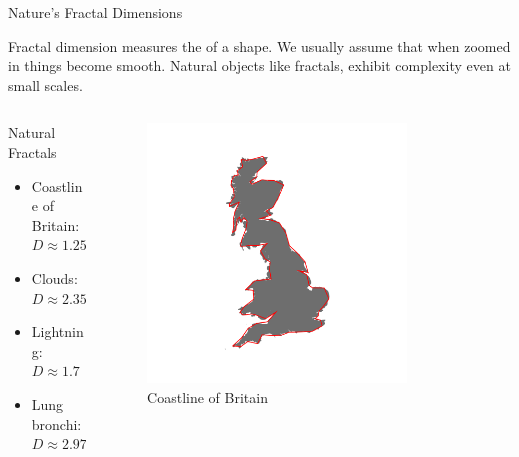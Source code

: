 \begin{frame}{Nature's Fractal Dimensions}

  Fractal dimension measures the  of a shape. We usually assume that
  when zoomed in things become smooth. Natural objects like fractals, exhibit complexity even at small scales.
  \begin{columns}
    \begin{column}{0.5\textwidth}
      \begin{conceptbox}{Natural Fractals}
        \begin{itemize}
          \item Coastline of Britain: $D \approx 1.25$
          \item Clouds: $D \approx 2.35$
          \item Lightning: $D \approx 1.7$
          \item Lung bronchi: $D \approx 2.97$
        \end{itemize}
      \end{conceptbox}
    \end{column}

    \begin{column}{0.5\textwidth}
      \begin{center}
        \begin{figure}
          \includegraphics[width=0.8\textwidth]{images/britain.png}
          \vspace{-0.75cm}
          \caption*{Coastline of Britain}
        \end{figure}
      \end{center}
    \end{column}
  \end{columns}
\end{frame}

